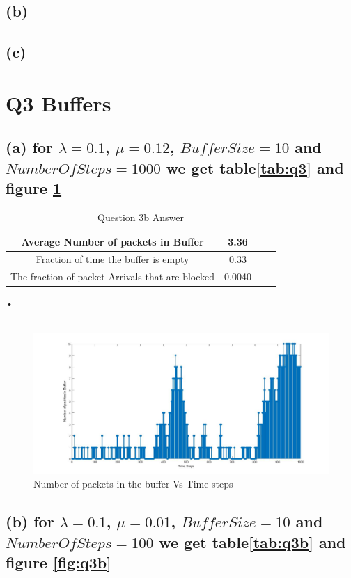 \documentclass[a4paper,11pt]{article}
\begin{document}
\subsection*{(b)}
\subsection*{(c)}
\newpage

\section*{Q3 \quad Buffers}

\subsection*{(a) for $\lambda = 0.1$, $\mu=0.12$, $BufferSize=10$ and $NumberOf Steps=1000$ we get table\ref{tab:q3} and figure \ref{fig:q3a} }

\begin{table}
\centering
\begin{tabular}{ |c|c|c|c| } 
\hline
 Average Number of packets in Buffer& 3.36  \\
 \hline
 Fraction of time the buffer is empty& 0.33 \\
 \hline
 The fraction of packet Arrivals that are blocked& 0.0040\\
\hline
\end{tabular}
\caption{Question 3b Answer } \label{tab:q3a}
\end{table}•\\\\
\begin{figure}[h]
   \hspace*{-6cm}
    \includegraphics[scale=0.5]{q3_1}
    \caption{Number of packets in the buffer Vs Time steps}\label{fig:q3a}
\end{figure}
\subsection*{(b) for $\lambda = 0.1$, $\mu=0.01$, $BufferSize=10$ and $NumberOf Steps=100$ we get table\ref{tab:q3b} and figure \ref{fig:q3b} }
\end{document}
